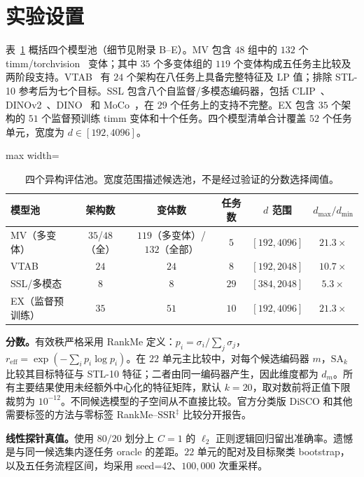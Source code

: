 \documentclass{article}
\newcommand{\reff}{\ensuremath{r_{\mathrm{eff}}}\xspace}
\newcommand{\SAk}{\ensuremath{\mathrm{SA}_k}\xspace}
\newcommand{\SSRdag}{\ensuremath{\mathrm{SSR}^{\ddagger}}\xspace}
\begin{document}
\section{实验设置}
表~\ref{tab:pool_setup_zh} 概括四个模型池（细节见附录 B--E）。MV 包含 $48$ 组中的 $132$ 个 timm/torchvision~\citep{wightman2019timm} 变体；其中 $35$ 个多变体组的 $119$ 个变体构成五任务主比较及两阶段支持。VTAB~\citep{zhai2019large} 有 $24$ 个架构在八任务上具备完整特征及 LP 值；排除 STL-10 参考后为七个目标。SSL 包含八个自监督/多模态编码器，包括 CLIP~\citep{radford2021clip}、DINOv2~\citep{oquab2023dinov2}、DINO~\citep{caron2021dino} 和 MoCo~\citep{he2020moco}，在 $29$ 个任务上的支持不完整。EX 包含 $35$ 个架构的 $51$ 个监督预训练 timm 变体和十个任务。四个模型清单合计覆盖 $52$ 个任务单元，宽度为 $d\in[192,4096]$。
\begin{table}[h]
\centering\small
\caption{四个异构评估池。宽度范围描述候选池，不是经过验证的分数选择阈值。}
\label{tab:pool_setup_zh}
\begin{adjustbox}{max width=\linewidth}
\begin{tabular}{lccccc}
\toprule
模型池 & 架构数 & 变体数 & 任务数 & $d$ 范围 & $d_{\max}/d_{\min}$ \\
\midrule
MV（多变体） & $35$/$48$（全） & $119$（多变体）/$132$（全部） & $5$ & $[192,4096]$ & $21.3\times$ \\
VTAB & $24$ & $24$ & $8$ & $[192,2048]$ & $10.7\times$ \\
SSL/多模态 & $8$ & $8$ & $29$ & $[384,2048]$ & $5.3\times$ \\
EX（监督预训练） & $35$ & $51$ & $10$ & $[192,4096]$ & $21.3\times$ \\
\bottomrule
\end{tabular}
\end{adjustbox}
\end{table}

\textbf{分数。}有效秩严格采用 RankMe 定义：$p_i=\sigma_i/\sum_j\sigma_j$，$\reff=\exp(-\sum_i p_i\log p_i)$。在 $22$ 单元主比较中，对每个候选编码器 $m$，$\SAk$ 比较其目标特征与 STL-10 特征；二者由同一编码器产生，因此维度都为 $d_m$。所有主要结果使用未经额外中心化的特征矩阵，默认 $k=20$，取对数前将正值下限裁剪为 $10^{-12}$。不同候选模型的子空间从不直接比较。官方分类版 DiSCO 和其他需要标签的方法与零标签 RankMe--\SSRdag 比较分开报告。

\textbf{线性探针真值。}使用 $80/20$ 划分上 $C=1$ 的 $\ell_2$ 正则逻辑回归留出准确率。遗憾是与同一候选集内逐任务 oracle 的差距。$22$ 单元的配对及目标聚类 bootstrap，以及五任务流程区间，均采用 seed=42、$100{,}000$ 次重采样。
\end{document}
